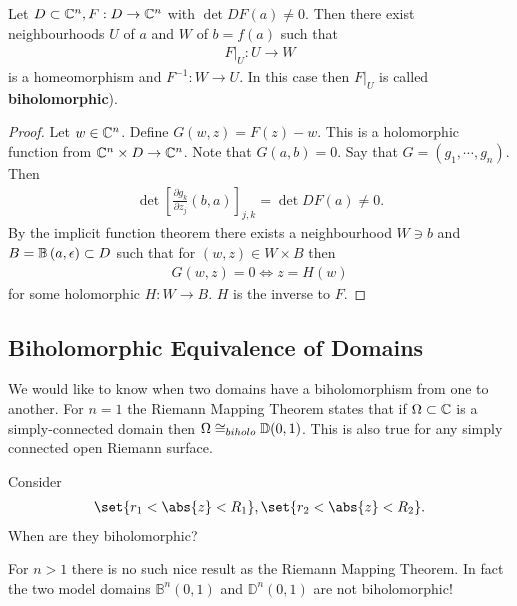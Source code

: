 \begin{theorem}
    Let $D \subset \mathbb{C}^n, F : D \to \mathbb{C}^n$ with $\det DF (a) \neq 0$. Then there exist neighbourhoods $U$ of $a$ and $W$ of $b = f(a)$ such that 
    \begin{align*}
        F |_U : U \to W
    \end{align*}
    is a homeomorphism and $F^{-1}: W \to U$. In this case then $F |_U$ is called \textbf{biholomorphic}).
\end{theorem}

\begin{proof}
    Let $w \in \mathbb{C}^n$. Define $G(w, z) = F(z) - w$. This is a holomorphic function from $\mathbb{C}^n \times D \to \mathbb{C}^n$. Note that $G(a,b) = 0$. Say that $G = (g_1, \cdots, g_n) $. Then
    \begin{align*}
        \det \left[ \frac{\partial g_k}{\partial z_j} (b,a) \right]_{j,k} = \det DF(a) \neq 0.
    \end{align*}
    By the implicit function theorem there exists a neighbourhood $W \ni b$ and $B = \ball{a}{\epsilon} \subset D$ such that for $(w , z ) \in W \times B$ then
    \begin{align*}
        G(w , z) = 0 \iff z = H(w)
    \end{align*}
    for some holomorphic $H : W \to B$. $H$ is the inverse to $F$.
\end{proof}

\subsection{Biholomorphic Equivalence of Domains}
We would like to know when two domains have a biholomorphism from one to another. For $n=1$ the Riemann Mapping Theorem states that if $\Omega \subset \mathbb{C}$ is a simply-connected domain then $\Omega \cong_{biholo} \mathbb{D}(0,1)$. This is also true for any simply connected open Riemann surface.

\begin{exercise}
    Consider
    \begin{align*}
        \set{ r_1 < \abs{z} < R_1 },
        \set{ r_2 < \abs{z} < R_2 }.
    \end{align*}
    When are they biholomorphic?
\end{exercise}

For $n>1 $ there is no such nice result as the Riemann Mapping Theorem. In fact the two model domains $\mathbb{B}^n (0,1)$ and $\mathbb{D}^n (0,1)$ are not biholomorphic!

